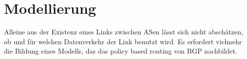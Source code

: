 \section{Modellierung}\label{sec:modellierung}

Alleine aus der Existenz eines Links zwischen ASen lässt sich nicht abschätzen,
ob und für welchen Datenverkehr der Link benutzt wird. Es erfordert vielmehr
die Bildung eines Modells, das das policy based routing von BGP nachbildet.

